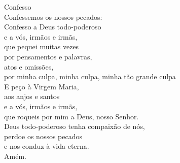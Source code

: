\textcolor{VioletRed1}{Confesso}
\vspace{0.2cm} \\
Confessemos os nossos pecados:
\vspace{0.1cm} \\
Confesso a Deus todo-poderoso \\
e a vós, irmãos e irmãs, \\
que pequei muitas vezes \\
por pensamentos e palavras, \\
atos e omissões, \\
por minha culpa, minha culpa, minha tão grande culpa \\
E peço à Virgem Maria, \\
aos anjos e santos \\
e a vós, irmãos e irmãs, \\
que roqueis por mim a Deus, nosso Senhor.
\vspace{0.1cm} \\
Deus todo-poderoso tenha compaixão de nós, \\
perdoe os nossos pecados \\
e nos conduz à vida eterna. \\
\RbarRed{} Amém.
\vspace{0.2cm} \\
